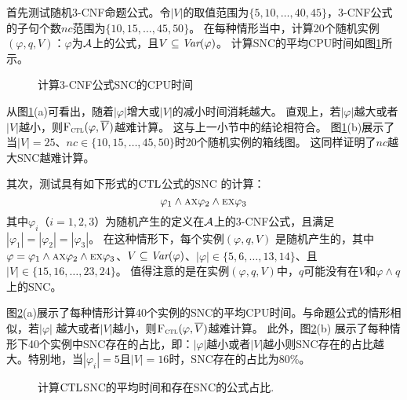 首先测试随机3-CNF命题公式。令$|V|$的取值范围为$\{5,10,\dots, 40,45\}$，3-CNF公式的子句个数$nc$范围为$\{10,15,\dots, 45,50\}$。
在每种情形当中，计算20个随机实例$(\varphi,q,V)$：$\varphi$为${\cal A}$上的公式，且$V\subseteq \textit{Var}(\varphi)$。
计算SNC的平均CPU时间如图\ref{chapter04:fig:ProTime}所示。

\begin{figure*}[!htb]
	\centering
	\caption{%
		计算3-CNF公式SNC的CPU时间}
	\label{chapter04:fig:ProTime}
\end{figure*}


从图\ref{chapter04:fig:ProTime}(a)可看出，随着$|\varphi|$增大或$|V|$的减小时间消耗越大。
直观上，若$|\varphi|$越大或者$|V|$越小，则${\textsc{F}_{\textsc{ctl}}}(\varphi, \overline{V})$越难计算。
这与上一小节中的结论相符合。
图\ref{chapter04:fig:ProTime}(b)展示了当$|V|= 25$、$nc\in \{10,15,\dots, 45, 50\}$时20个随机实例的箱线图。
这同样证明了$nc$越大SNC越难计算。


其次，测试具有如下形式的$\textrm{CTL}$公式的SNC 的计算：
$$\varphi_1 \wedge \textsc{a} \textsc{x} \varphi_2 \wedge \textsc{e}\textsc{x} \varphi_3$$
其中$\varphi_i$（$i=1,2,3$）为随机产生的定义在${\cal A}$上的3-CNF公式，且满足$|\varphi_1|=|\varphi_2|=|\varphi_3|$。
在这种情形下，每个实例$(\varphi, q, V)$ 是随机产生的，其中$\varphi=\varphi_1 \wedge \textsc{a} \textsc{x} \varphi_2 \wedge \textsc{e}\textsc{x} \varphi_3$、$V\subseteq \textit{Var}(\varphi)$、$|\varphi|\in \{5,6,\dots, 13,14\}$、且$|V|\in \{15,16,\dots, 23,24\}$。
值得注意的是在实例$(\varphi, q, V)$中，$q$可能没有在$V$和$\varphi\wedge q$上的SNC。

图\ref{chapter04:fig:CtlTime}(a)展示了每种情形计算40个实例的SNC的平均CPU时间。与命题公式的情形相似，若$|\varphi|$ 越大或者$|V|$越小，则${\textsc{F}_{\textsc{ctl}}}(\varphi, \overline{V})$越难计算。
此外，图\ref{chapter04:fig:CtlTime}(b) 展示了每种情形下40个实例中SNC存在的占比，即：$|\varphi|$越小或者$|V|$越小则SNC存在的占比越大。特别地，当$|\varphi_i|=5$且$|V|=16$时，SNC存在的占比为80\%。



\begin{figure*}[!htb]
	\centering
	\caption{计算$\textrm{CTL}$SNC的平均时间和存在SNC的公式占比.}
	\label{chapter04:fig:CtlTime}
\end{figure*}

